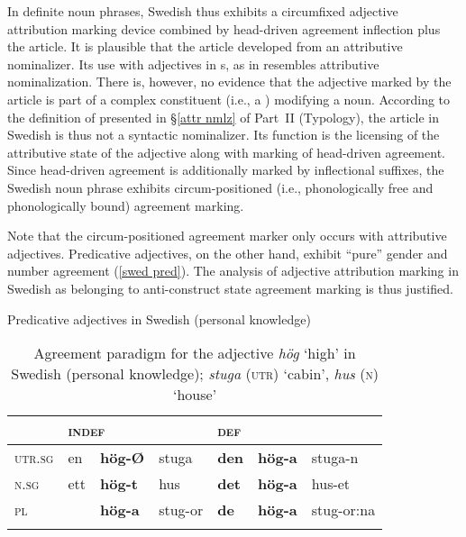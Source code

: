 In definite noun phrases, Swedish thus exhibits a circumfixed adjective attribution marking device combined by head\hyp{}driven agreement inflection plus the article. It is plausible that the article developed from an attributive nominalizer. Its use with adjectives in s, as in  resembles attributive nominalization. There is, however, no evidence that the adjective marked by the article is part of a complex constituent (i.e., a ) modifying a noun. According to the definition of  presented in \S\ref{attr nmlz} of Part~II (Typology), the article in Swedish is thus not a syntactic nominalizer. Its function is the licensing of the attributive state of the adjective along with marking of head\hyp{}driven agreement. Since head\hyp{}driven agreement is additionally marked by inflectional suffixes, the Swedish noun phrase exhibits circum-positioned (i.e., phonologically free and phonologically bound) agreement marking.

Note that the circum-positioned agreement marker only occurs with attributive adjectives. Predicative adjectives, on the other hand, exhibit “pure” gender and number agreement (\ref{swed pred}). The analysis of adjective attribution marking in Swedish as belonging to anti\hyp{}construct state agreement marking is thus justified.
\begin{exe}
\ex \rm{Predicative adjectives in Swedish (personal knowledge)}
\label{swed pred}
\begin{xlist}
\end{xlist}
\end{exe}
\begin{table}
\begin{tabular}{l l l l l l l}
\lsptoprule
			&\multicolumn{3}{l}{\textsc{indef}}	&\multicolumn{3}{l}{\textsc{def}}\\
\midrule
\textsc{utr.sg}	&en	&\textbf{h{ö}g-Ø}&stuga		&\textbf{den}&\textbf{h{ö}g-a}&stuga-n\\

\textsc{n.sg}	&ett	&\textbf{h{ö}g-t}&hus		&\textbf{det}&\textbf{h{ö}g-a}&hus-et\\

\textsc{pl}		&	&\textbf{h{ö}g-a}&stug-or	&\textbf{de}&\textbf{h{ö}g-a}&stug-or:na\\
\lspbottomrule
\end{tabular}
\caption[Adjective paradigm for Swedish]{Agreement paradigm for the adjective \textit{hög} ‘high’ in Swedish (personal knowledge); \textit{stuga} (\textsc{utr}) ‘cabin’, \textit{hus} (\textsc{n}) ‘house’
}
\end{table}

